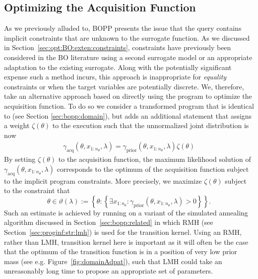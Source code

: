 
\subsection{Optimizing the Acquisition Function}
\label{sec:optacqfunc}

As we previously alluded to, BOPP presents the issue that the query contains implicit constraints that are unknown to the surrogate function.  As we discussed in 
Section~\ref{sec:opt:BO:exten:constraints}, constraints have previously been considered
in the BO literature using a second surrogate model or an appropriate adaptation to the
existing surrogate.  Along with the potentially significant expense such a method incurs, this approach is inappropriate for \emph{equality} constraints or when the target variables are potentially discrete.  We, therefore, take an alternative approach based on directly using the program to optimize the acquisition function.  To do so we consider a transformed program  that is identical to  (see Section \ref{sec:bopp:domain}), but adds an additional \observe statement that assigns a weight $\zeta(\theta)$ to the execution such that the unnormalized joint distribution is now 
\begin{align}
\label{eq:bopp:qacq}
\gamma_{\text{acq}}(\theta,x_{1:n_{\theta}},\lambda) = \gamma_{\text{prior}}(\theta,x_{1:n_{\theta}},\lambda) \zeta(\theta)
\end{align}
By setting $\zeta(\theta)$ to the acquisition function, the maximum likelihood solution 
of $\gamma_{\text{acq}}(\theta,x_{1:n_{\theta}},\lambda)$ corresponds to the optimum of the acquisition function 
subject to the implicit program constraints.  More precisely, we maximize $\zeta(\theta)$ subject to
the constraint that
\[
\theta \in \vartheta(\lambda) := \left\{\theta : \left\{\exists x_{1:n_{\theta}} :
 \gamma_{\text{prior}}(\theta,x_{1:n_{\theta}},\lambda)>0\right\} \right\}.
\]
Such an estimate is achieved by running on \qacq a variant of the simulated annealing algorithm 
discussed in Section~\ref{sec:bopp:related} in which RMH (see Section~\ref{sec:proginf:str:lmh}) is used for
the transition kernel.  Using an RMH, rather than LMH, transition kernel here is important as it will often
be the case that the optimum of the transition function is in a position of very low prior mass (see e.g. Figure~\ref{fig:domainAdpat}),
such that LMH could take an unreasonably long time to propose an appropriate set of parameters.

